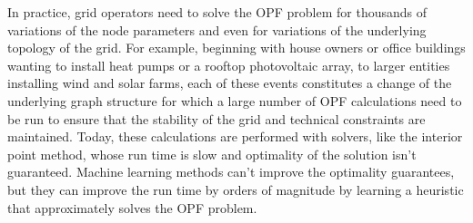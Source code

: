 In practice, grid operators need to solve the OPF problem for thousands of variations of the node parameters and even for variations of the
underlying topology of the grid.
For example, beginning with house owners or office buildings wanting to install heat pumps or a rooftop photovoltaic array,
to larger entities installing wind and solar farms, each of these events constitutes a change of the underlying graph structure for
which a large number of OPF calculations need to be run to ensure that the stability of the grid and technical constraints are maintained.
Today, these calculations are performed with solvers, like the interior point method, whose run time is slow and optimality of
the solution isn't guaranteed\cite{cain2012history}.
Machine learning methods can't improve the optimality guarantees, but they can improve the run time by orders of magnitude by learning a heuristic that approximately solves the OPF problem.